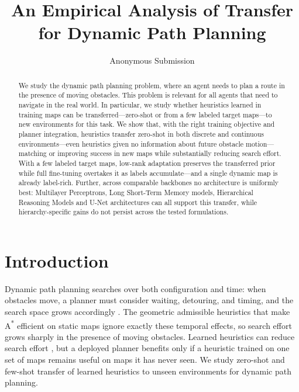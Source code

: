 \documentclass[letterpaper]{article} %
\title{An Empirical Analysis of Transfer for Dynamic Path Planning}
\author{
    Anonymous Submission
}
\begin{document}
\maketitle

\begin{abstract}
We study the dynamic path planning problem, where an agent needs to plan a route in the presence of moving obstacles. This problem is relevant for all agents that need to navigate in the real world. In particular, we study whether heuristics learned in training maps can be transferred---zero-shot or from a few labeled target maps---to new environments for this task. We show that, with the right training objective and planner integration, heuristics transfer zero-shot in both discrete and continuous environments---even heuristics given no information about future obstacle motion---matching or improving success in new maps while substantially reducing search effort. With a few labeled target maps, low-rank adaptation preserves the transferred prior while full fine-tuning overtakes it as labels accumulate---and a single dynamic map is already label-rich. Further, across comparable backbones no architecture is uniformly best: Multilayer Perceptrons, Long Short-Term Memory models, Hierarchical Reasoning Models and U-Net architectures can all support this transfer, while hierarchy-specific gains do not persist across the tested formulations.
\end{abstract}


\section{Introduction}

Dynamic path planning searches over both configuration and time: when obstacles move, a planner must consider waiting, detouring, and timing, and the search space grows accordingly \citep{silver2005cooperative,phillips2011sipp}. The geometric admissible heuristics that make A\textsuperscript{*} \citep{hart1968astar} efficient on static maps ignore exactly these temporal effects, so search effort grows sharply in the presence of moving obstacles. Learned heuristics can reduce search effort \citep{arfaee2011bootstrap,bhardwaj2017sail,yonetani2021neuralastar}, but a deployed planner benefits only if a heuristic trained on one set of maps remains useful on maps it has never seen. We study zero-shot and few-shot transfer of learned heuristics to unseen environments for dynamic path planning.
\end{document}
